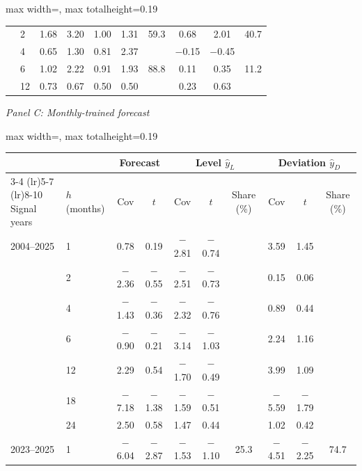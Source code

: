 \begin{table}[htbp]
{\begin{adjustbox}{max width=\linewidth, max totalheight=0.19\textheight}
\begin{tabular}{llcccccccc}
 & 2 & \phantom{$-$}1.68 & \phantom{$-$}3.20 & \phantom{$-$}1.00 & \phantom{$-$}1.31 & 59.3 & \phantom{$-$}0.68 & \phantom{$-$}2.01 & 40.7 \\
 & 4 & \phantom{$-$}0.65 & \phantom{$-$}1.30 & \phantom{$-$}0.81 & \phantom{$-$}2.37 &  & $-$0.15 & $-$0.45 &  \\
 & 6 & \phantom{$-$}1.02 & \phantom{$-$}2.22 & \phantom{$-$}0.91 & \phantom{$-$}1.93 & 88.8 & \phantom{$-$}0.11 & \phantom{$-$}0.35 & 11.2 \\
 & 12 & \phantom{$-$}0.73 & \phantom{$-$}0.67 & \phantom{$-$}0.50 & \phantom{$-$}0.50 &  & \phantom{$-$}0.23 & \phantom{$-$}0.63 &  \\
\bottomrule
\end{tabular}
\end{adjustbox}
\par\medskip
\textit{Panel C: Monthly-trained forecast}\\[2pt]
\begin{adjustbox}{max width=\linewidth, max totalheight=0.19\textheight}
\begin{tabular}{llcccccccc}
\toprule
\multicolumn{2}{c}{} & \multicolumn{2}{c}{Forecast} & \multicolumn{3}{c}{Level $\hat y_L$} & \multicolumn{3}{c}{Deviation $\hat y_D$} \\
\cmidrule(lr){3-4} \cmidrule(lr){5-7} \cmidrule(lr){8-10}
Signal years & $h$ (months) & Cov & $t$ & Cov & $t$ & Share (\%) & Cov & $t$ & Share (\%) \\
\midrule
2004--2025 & 1 & \phantom{$-$}0.78 & \phantom{$-$}0.19 & $-$2.81 & $-$0.74 &  & \phantom{$-$}3.59 & \phantom{$-$}1.45 &  \\
 & 2 & $-$2.36 & $-$0.55 & $-$2.51 & $-$0.73 &  & \phantom{$-$}0.15 & \phantom{$-$}0.06 &  \\
 & 4 & $-$1.43 & $-$0.36 & $-$2.32 & $-$0.76 &  & \phantom{$-$}0.89 & \phantom{$-$}0.44 &  \\
 & 6 & $-$0.90 & $-$0.21 & $-$3.14 & $-$1.03 &  & \phantom{$-$}2.24 & \phantom{$-$}1.16 &  \\
 & 12 & \phantom{$-$}2.29 & \phantom{$-$}0.54 & $-$1.70 & $-$0.49 &  & \phantom{$-$}3.99 & \phantom{$-$}1.09 &  \\
 & 18 & $-$7.18 & $-$1.38 & $-$1.59 & $-$0.51 &  & $-$5.59 & $-$1.79 &  \\
 & 24 & \phantom{$-$}2.50 & \phantom{$-$}0.58 & \phantom{$-$}1.47 & \phantom{$-$}0.44 &  & \phantom{$-$}1.02 & \phantom{$-$}0.42 &  \\
\midrule
2023--2025 & 1 & $-$6.04 & $-$2.87 & $-$1.53 & $-$1.10 & 25.3 & $-$4.51 & $-$2.25 & 74.7 \\

\end{tabular}
\end{adjustbox}}
\end{table}

